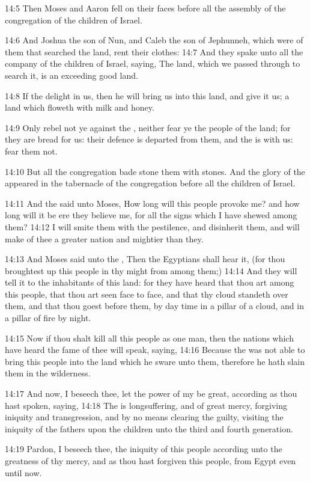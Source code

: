 14:5 Then Moses and Aaron fell on their faces before all the assembly of the congregation of the children of Israel.

14:6 And Joshua the son of Nun, and Caleb the son of Jephunneh, which were of them that searched the land, rent their clothes: 14:7 And they spake unto all the company of the children of Israel, saying, The land, which we passed through to search it, is an exceeding good land.

14:8 If the \LORD delight in us, then he will bring us into this land, and give it us; a land which floweth with milk and honey.

14:9 Only rebel not ye against the \LORD, neither fear ye the people of the land; for they are bread for us: their defence is departed from them, and the \LORD is with us: fear them not.

14:10 But all the congregation bade stone them with stones. And the glory of the \LORD appeared in the tabernacle of the congregation before all the children of Israel.

14:11 And the \LORD said unto Moses, How long will this people provoke me?  and how long will it be ere they believe me, for all the signs which I have shewed among them?  14:12 I will smite them with the pestilence, and disinherit them, and will make of thee a greater nation and mightier than they.

14:13 And Moses said unto the \LORD, Then the Egyptians shall hear it, (for thou broughtest up this people in thy might from among them;) 14:14 And they will tell it to the inhabitants of this land: for they have heard that thou \LORD art among this people, that thou \LORD art seen face to face, and that thy cloud standeth over them, and that thou goest before them, by day time in a pillar of a cloud, and in a pillar of fire by night.

14:15 Now if thou shalt kill all this people as one man, then the nations which have heard the fame of thee will speak, saying, 14:16 Because the \LORD was not able to bring this people into the land which he sware unto them, therefore he hath slain them in the wilderness.

14:17 And now, I beseech thee, let the power of my \LORD be great, according as thou hast spoken, saying, 14:18 The \LORD is longsuffering, and of great mercy, forgiving iniquity and transgression, and by no means clearing the guilty, visiting the iniquity of the fathers upon the children unto the third and fourth generation.

14:19 Pardon, I beseech thee, the iniquity of this people according unto the greatness of thy mercy, and as thou hast forgiven this people, from Egypt even until now.

